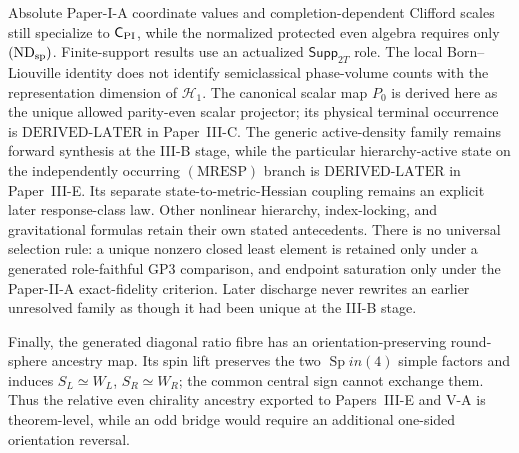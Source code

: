 \documentclass[12pt,a4paper]{article}
\begin{document}
Absolute Paper-I-A coordinate values and completion-dependent Clifford scales
still specialize to \(\mathsf C_{\rm PI}\), while the normalized protected
even algebra requires only \((\mathrm{ND}_{\rm sp})\).  Finite-support
results use an actualized \(\mathsf{Supp}_{2T}\) role.  The local
Born--Liouville identity does not identify semiclassical phase-volume counts
with the representation dimension of \(\mathcal H_1\).  The canonical scalar
map \(P_0\) is derived here as the unique allowed parity-even scalar projector;
its physical terminal occurrence is
\(\mathrm{DERIVED\text{-}LATER}\) in Paper~III-C.  The generic active-density
family remains forward synthesis at the III-B stage, while the particular
hierarchy-active state on the independently occurring \((\mathrm{MRESP})\)
branch is \(\mathrm{DERIVED\text{-}LATER}\) in Paper~III-E.  Its separate
state-to-metric-Hessian coupling remains an explicit later response-class
law.  Other nonlinear hierarchy, index-locking, and gravitational formulas
retain their own stated antecedents.  There is no universal selection rule: a
unique nonzero closed least element is retained only under a generated
role-faithful GP3 comparison, and endpoint saturation only under the
Paper-II-A exact-fidelity criterion.  Later discharge never rewrites an
earlier unresolved family as though it had been unique at the III-B stage.

Finally, the generated diagonal ratio fibre has an orientation-preserving
round-sphere ancestry map.  Its spin lift preserves the two \(\operatorname{Sp}in(4)\)
simple factors and induces \(S_L\simeq W_L\), \(S_R\simeq W_R\); the common
central sign cannot exchange them.  Thus the relative even chirality ancestry
exported to Papers~III-E and V-A is theorem-level, while an odd bridge would
require an additional one-sided orientation reversal.


\printbibliography
\end{document}
